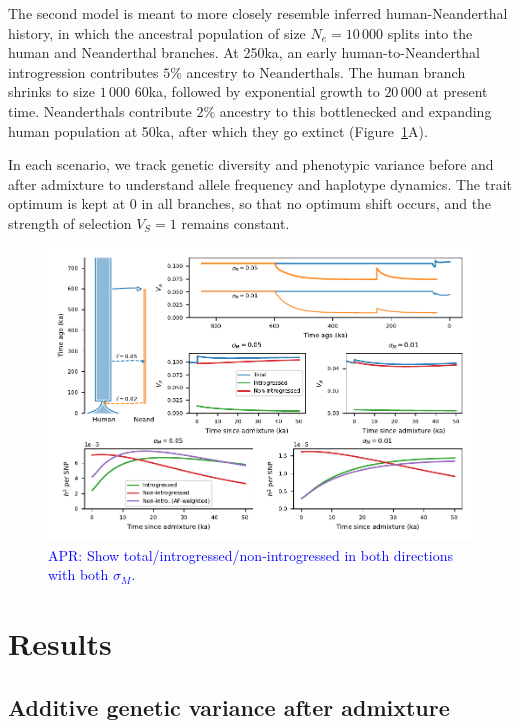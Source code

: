\documentclass{article}
\newcommand{\aprcomment}[1]{{\textcolor{blue}{APR: #1}}}
\begin{document}
The second model is meant to more closely resemble inferred human-Neanderthal
history, in which the ancestral population of size $N_e=10\,000$ splits into
the human and Neanderthal branches. At 250ka, an early human-to-Neanderthal
introgression contributes $5\%$ ancestry to Neanderthals. The human branch
shrinks to size $1\,000$ 60ka, followed by exponential growth to $20\,000$ at
present time. Neanderthals contribute $2\%$ ancestry to this bottlenecked and
expanding human population at 50ka, after which they go extinct
(Figure~\ref{fig:neand-to-human}A).

In each scenario, we track genetic diversity and phenotypic variance before and
after admixture to understand allele frequency and haplotype dynamics. The
trait optimum is kept at $0$ in all branches, so that no optimum shift occurs,
and the strength of selection $V_S=1$ remains constant.

\begin{figure}[t!]
    \centering
    \includegraphics{../figures/neanderthal_admixture.pdf}
    \caption{
        \textbf{}
        \aprcomment{Show total/introgressed/non-introgressed in both directions
        with both $\sigma_M$.}
    }
    \label{fig:neand-to-human}
\end{figure}

\section*{Results}

\subsection*{Additive genetic variance after admixture}
\end{document}
